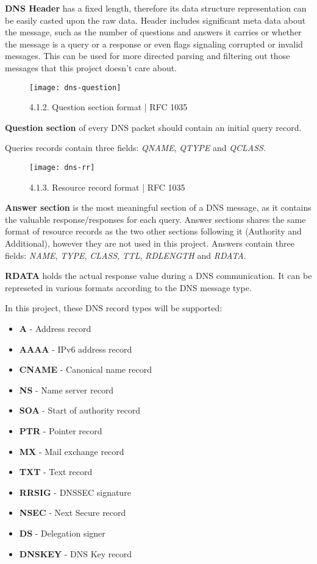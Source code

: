 \textbf{DNS Header} has a fixed length, therefore its data structure representation can be easily casted upon the raw data.
Header includes significant meta data about the message, such as the number of questions and answers it carries 
or whether the message is a query or a response or even flags signaling corrupted or invalid messages.
This can be used for more directed parsing and filtering out those messages that this project doesn't care about.

\vspace{1cm}
\begin{figure}[h]
\texttt{[image: dns-question]}
\centering
\caption{4.1.2. Question section format | RFC 1035}
\end{figure}

\textbf{Question section} of every DNS packet should contain an initial query record. 

Queries records contain three fields: \textit{QNAME}, \textit{QTYPE} and \textit{QCLASS}.

\vspace{1cm}
\begin{figure}[H]
\texttt{[image: dns-rr]}
\centering
\caption{4.1.3. Resource record format | RFC 1035}
\end{figure}

\textbf{Answer section} is the most meaningful section of a DNS message, as it contains the valuable response/responses for each query.
Answer sections shares the same format of resource records as the two other sections following it (Authority and Additional), however they are not used in this project.
Answers contain three fields: \textit{NAME}, \textit{TYPE}, \textit{CLASS}, \textit{TTL}, \textit{RDLENGTH} and \textit{RDATA}.

\textbf{RDATA} holds the actual response value during a DNS communication.
It can be represeted in various formats according to the DNS message type.

In this project, these DNS record types will be supported:
\begin{itemize}
\item \textbf{A} - Address record 
\item \textbf{AAAA} - IPv6 address record
\item \textbf{CNAME} - Canonical name record
\item \textbf{NS} - Name server record
\item \textbf{SOA} - Start of authority record
\item \textbf{PTR} - Pointer record
\item \textbf{MX} - Mail exchange record
\item \textbf{TXT} - Text record
\item \textbf{RRSIG} - DNSSEC signature
\item \textbf{NSEC} - Next Secure record
\item \textbf{DS} - Delegation signer
\item \textbf{DNSKEY} - DNS Key record
\end{itemize}

